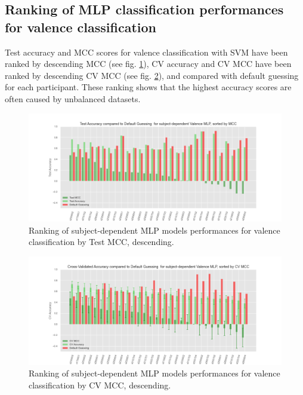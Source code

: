 \subsection{Ranking of MLP classification performances for valence classification}
\label{sec:appendix_A4.4}
Test accuracy and \ac{MCC} scores for valence classification with \ac{SVM} have been ranked by descending \ac{MCC} (see fig. \ref{fig:test_acc_mcc_valence_mlp}), CV accuracy and \ac{CV MCC} have been ranked by descending \ac{CV MCC} (see fig. \ref{fig:test_cv_acc_mcc_valence_mlp}), and compared with default guessing for each participant. These ranking shows that the highest accuracy scores are often caused by unbalanced datasets. 

\begin{figure}[!htb]
\includegraphics[width=16cm]{img/appendix/final_experiment/test_acc_mcc_valence_mlp.png}
\centering
\caption{Ranking of subject-dependent MLP models performances for valence classification by Test MCC, descending.}\label{fig:test_acc_mcc_valence_mlp}
\end{figure}

\begin{figure}[!htb]
\includegraphics[width=16cm]{img/appendix/final_experiment/test_cv_acc_mcc_valence_mlp.png}
\centering
\caption{Ranking of subject-dependent MLP models performances for valence classification by CV MCC, descending.}\label{fig:test_cv_acc_mcc_valence_mlp}
\end{figure}
